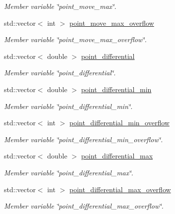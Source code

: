 \begin{DoxyCompactItemize}
\begin{DoxyCompactList}\small\item\em Member variable \char`\"{}point\+\_\+move\+\_\+max\char`\"{}. \end{DoxyCompactList}\item 
std\+::vector$<$ int $>$ \mbox{\hyperlink{classPoint_a702a47d6ecf6fdcd8d2420ba0e3b3e86}{point\+\_\+move\+\_\+max\+\_\+overflow}}
\begin{DoxyCompactList}\small\item\em Member variable \char`\"{}point\+\_\+move\+\_\+max\+\_\+overflow\char`\"{}. \end{DoxyCompactList}\item 
std\+::vector$<$ double $>$ \mbox{\hyperlink{classPoint_ab015c120be197a2338719eceb0506d76}{point\+\_\+differential}}
\begin{DoxyCompactList}\small\item\em Member variable \char`\"{}point\+\_\+differential\char`\"{}. \end{DoxyCompactList}\item 
std\+::vector$<$ double $>$ \mbox{\hyperlink{classPoint_adaa3334658ce9dad7542bbe5d0b94ef3}{point\+\_\+differential\+\_\+min}}
\begin{DoxyCompactList}\small\item\em Member variable \char`\"{}point\+\_\+differential\+\_\+min\char`\"{}. \end{DoxyCompactList}\item 
std\+::vector$<$ int $>$ \mbox{\hyperlink{classPoint_aa1ffa865d85687a905c805babb117a3a}{point\+\_\+differential\+\_\+min\+\_\+overflow}}
\begin{DoxyCompactList}\small\item\em Member variable \char`\"{}point\+\_\+differential\+\_\+min\+\_\+overflow\char`\"{}. \end{DoxyCompactList}\item 
std\+::vector$<$ double $>$ \mbox{\hyperlink{classPoint_a425668a281378a22012e6e5d2a51a3fa}{point\+\_\+differential\+\_\+max}}
\begin{DoxyCompactList}\small\item\em Member variable \char`\"{}point\+\_\+differential\+\_\+max\char`\"{}. \end{DoxyCompactList}\item 
std\+::vector$<$ int $>$ \mbox{\hyperlink{classPoint_a2d564b1268fad445926e1d14873e3a8e}{point\+\_\+differential\+\_\+max\+\_\+overflow}}
\begin{DoxyCompactList}\small\item\em Member variable \char`\"{}point\+\_\+differential\+\_\+max\+\_\+overflow\char`\"{}. \end{DoxyCompactList}\item 

\end{DoxyCompactItemize}
